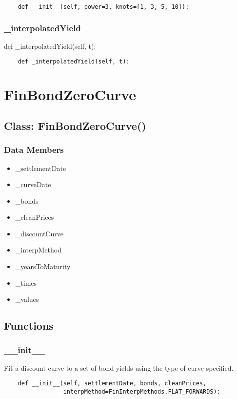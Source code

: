 \documentclass[twoside,11pt]{book}
\begin{document}
\begin{lstlisting}
    def __init__(self, power=3, knots=[1, 3, 5, 10]):
\end{lstlisting}

\subsubsection*{{\bf \_interpolatedYield}}
def \_interpolatedYield(self, t): 

\begin{lstlisting}
    def _interpolatedYield(self, t):
\end{lstlisting}

\newpage
\section{FinBondZeroCurve}

\subsection*{Class: FinBondZeroCurve()}


\subsubsection*{Data Members}
\begin{itemize}
\item{\_settlementDate}
\item{\_curveDate}
\item{\_bonds}
\item{\_cleanPrices}
\item{\_discountCurve}
\item{\_interpMethod}
\item{\_yearsToMaturity}
\item{\_times}
\item{\_values}
\end{itemize}

\subsection*{Functions}

\subsubsection*{{\bf \_\_init\_\_}}
Fit a discount curve to a set of bond yields using the type of  curve specified.  

\begin{lstlisting}
    def __init__(self, settlementDate, bonds, cleanPrices,
                 interpMethod=FinInterpMethods.FLAT_FORWARDS):
\end{lstlisting}
\end{document}
